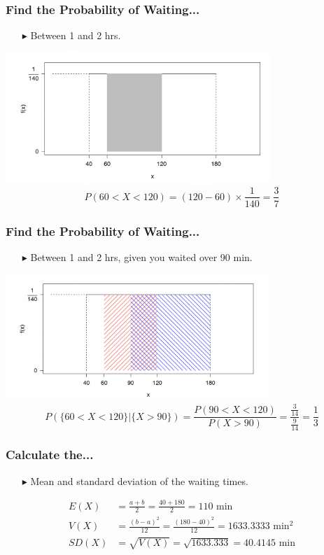 \documentclass[12pt]{beamer}
\begin{document}
\begin{frame}
	\frametitle{Find the Probability of Waiting...}
	\begin{itemize}
		\item[\color{blue}$\blacktriangleright$] Between 1 and 2 hrs.
	\end{itemize}
	\centering
	\includegraphics[width=10cm]{uniform2.png}
	\[P(60<X<120) = (120-60)\times\frac{1}{140}=\frac{3}{7}\]
\end{frame}
\begin{frame}
	\frametitle{Find the Probability of Waiting...}
	\begin{itemize}
		\item[\color{blue}$\blacktriangleright$] Between 1 and 2 hrs, given you waited over 90 min.
	\end{itemize}
	\centering
	\includegraphics[width=10cm]{uniform3.png}
	\[P(\{60<X<120\}|\{X>90\})=\frac{P(90<X<120)}{P(X>90)}=\frac{\frac{3}{14}}{\frac{9}{14}}=\frac{1}{3}\]
\end{frame}
\begin{frame}
	\frametitle{Calculate the...}
	
	\begin{itemize}
	\item[\color{blue}$\blacktriangleright$] Mean and standard deviation of the waiting times.
	\end{itemize}
		\begin{align*}
			E(X) &= \frac{a + b}{2} = \frac{40 + 180}{2} = 110 \text{ min} \\[1em]
			V(X) &= \frac{(b - a)^2}{12} = \frac{(180 - 40)^2}{12} = 1633.3333 \text{ min}^2 \\[1em]
			SD(X) &= \sqrt{V(X)} = \sqrt{1633.333} = 40.4145 \text{ min}
		\end{align*}
	
\end{frame}
\end{document}
